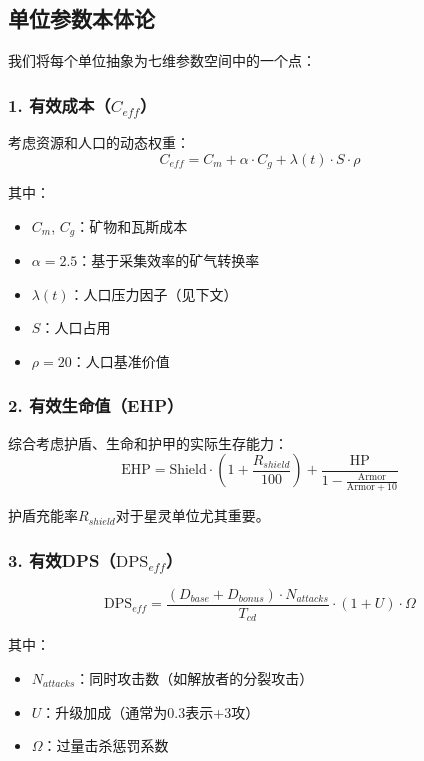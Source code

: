 \documentclass[a4paper,12pt]{article}
\begin{document}
\subsection{单位参数本体论}
我们将每个单位抽象为七维参数空间中的一个点：

\subsubsection{1. 有效成本（$C_{eff}$）}
考虑资源和人口的动态权重：
\begin{equation}
C_{eff} = C_m + \alpha \cdot C_g + \lambda(t) \cdot S \cdot \rho
\end{equation}

其中：
\begin{itemize}
\item $C_m$, $C_g$：矿物和瓦斯成本
\item $\alpha = 2.5$：基于采集效率的矿气转换率
\item $\lambda(t)$：人口压力因子（见下文）
\item $S$：人口占用
\item $\rho = 20$：人口基准价值
\end{itemize}

\subsubsection{2. 有效生命值（EHP）}
综合考虑护盾、生命和护甲的实际生存能力：
\begin{equation}
\text{EHP} = \text{Shield} \cdot (1 + \frac{R_{shield}}{100}) + \frac{\text{HP}}{1 - \frac{\text{Armor}}{\text{Armor} + 10}}
\end{equation}

护盾充能率$R_{shield}$对于星灵单位尤其重要。

\subsubsection{3. 有效DPS（$\text{DPS}_{eff}$）}
\begin{equation}
\text{DPS}_{eff} = \frac{(D_{base} + D_{bonus}) \cdot N_{attacks}}{T_{cd}} \cdot (1 + U) \cdot \Omega
\end{equation}

其中：
\begin{itemize}
\item $N_{attacks}$：同时攻击数（如解放者的分裂攻击）
\item $U$：升级加成（通常为0.3表示+3攻）
\item $\Omega$：过量击杀惩罚系数
\end{itemize}
\end{document}
